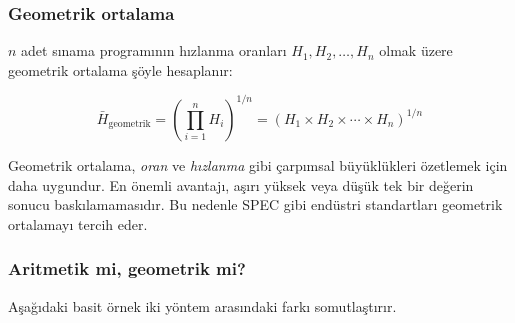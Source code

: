 \subsubsection*{Geometrik ortalama}

$n$ adet sınama programının hızlanma oranları $H_1, H_2, \ldots, H_n$ olmak üzere geometrik ortalama şöyle hesaplanır:

\begin{equation}
\bar{H}_{\text{geometrik}} = \left( \prod_{i=1}^{n} H_i \right)^{1/n} = \left( H_1 \times H_2 \times \cdots \times H_n \right)^{1/n}
\label{eq:geometrik-ort}
\end{equation}

Geometrik ortalama, \emph{oran} ve \emph{hızlanma} gibi çarpımsal büyüklükleri özetlemek için daha uygundur. En önemli avantajı, aşırı yüksek veya düşük tek bir değerin sonucu baskılamamasıdır. Bu nedenle SPEC gibi endüstri standartları geometrik ortalamayı tercih eder.

\subsubsection*{Aritmetik mi, geometrik mi?}

Aşağıdaki basit örnek iki yöntem arasındaki farkı somutlaştırır.

